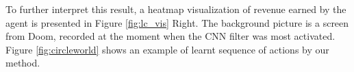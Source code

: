 To further interpret this result, 
a heatmap visualization of revenue earned by the agent is presented in Figure \ref{fig:lc_vis} Right.
The background picture is a screen from Doom, recorded at the moment when the CNN filter was most activated.
Figure \ref{fig:circleworld} shows an example of learnt sequence of actions by our method.





